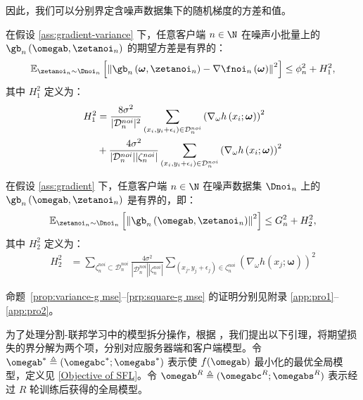 因此，我们可以分别界定含噪声数据集下的随机梯度的方差和值。

\begin{proposition}[均方差损失下含标签噪声的随机梯度的方差]\label{prop:variance-g mse}
在假设 \ref{ass:gradient-variance} 下，任意客户端 $n\in\N$ 在噪声小批量上的 $\gb_n\left(\omegab,\zetanoi_n\right)$ 的期望方差是有界的：
\begin{equation}\label{bounded-variance with noise}
     \mathbb{E}_{\zetanoi_n\sim \Dnoi_n}\left[\left\Vert \gb_n\left(\boldsymbol{\omega},\zetanoi_n\right) - \nabla \fnoi_n\left(\boldsymbol{\omega}\right) \right\Vert^2 \right] \leq \phi_n^2+H_1^2,
\end{equation}
其中 $H_1^2$ 定义为：
\begin{align}\label{eq:H}
    H_1^2 &= \frac{8\sigma^2}{|\mathcal{D}_n^{noi}|^2}\sum_{\left(x_{i},y_{i}+\epsilon_{i}\right)\in \mathcal{D}_n^{noi}}\left(
\nabla_\omega  h\left(x_{i};\boldsymbol{\omega}\right)\right)^2 \notag\\
    &+\frac{4\sigma^2}{|\mathcal{D}_n^{noi}||\zeta_n^{noi}|}\sum_{\left(x_{i},y_{i}+\epsilon_{i}\right)\in \mathcal{D}_n^{noi}}\left(
\nabla_\omega  h\left(x_{i};\boldsymbol{\omega}\right)\right)^2
\end{align}
\end{proposition}

\begin{proposition}[均方差损失下含标签噪声的随机梯度的平方的期望]\label{prp:square-g mse}
在假设 \ref{ass:gradient} 下，任意客户端 $n\in\N$ 在噪声数据集 $\Dnoi_n$ 上的 $\gb_n\left(\omegab,\zetanoi_n\right)$ 是有界的，即：
\begin{equation}
    \mathbb{E}_{\zetanoi_n\sim \Dnoi_n}\left[\left\Vert \gb_n\left(\omegab, \zetanoi_n\right) \right\Vert^2\right] \leq G_n^2 + H_2^2,
\end{equation}
其中 $H_2^2$ 定义为：
\begin{align}\label{eq:H}
    H_2^2 &= \sum_{\zeta_n^{noi}\subset\mathcal{D}_n^{noi}} \frac{4\sigma^2}{|\mathcal{D}_n^{noi}||\zeta_n^{noi}|}\sum_{\left(x_{j},y_{j}+\epsilon_{j}\right)\in \zeta_n^{noi}}\left(
\nabla_\omega  h\left(x_{j};\boldsymbol{\omega}\right)\right)^2
\end{align}
\end{proposition}

命题~\ref{prop:variance-g mse}--\ref{prp:square-g mse} 的证明分别见附录 \ref{app:pro1}--\ref{app:pro2}。

为了处理分割-联邦学习中的模型拆分操作，根据 \cite{b8}，我们提出以下引理，将期望损失的界分解为两个项，分别对应服务器端和客户端模型。令 $\omegab^*\triangleq(\omegabc^*; \omegabs^*)$ 表示使 $f(\omegab)$ 最小化的最优全局模型，定义见 \eqref{Objective of SFL}。令 $\omegab^R\triangleq(\omegabc^R; \omegabs^R)$ 表示经过 $R$ 轮训练后获得的全局模型。

